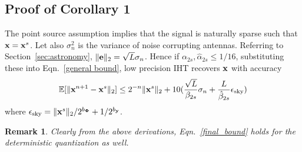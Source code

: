 \documentclass{article}
\newtheorem{remark}{Remark}
\begin{document}
\subsection{Proof of Corollary 1}
The point source assumption implies that the signal is naturally sparse such that ${\bf x} = {\bf x}^s$. Let also $\sigma_n^2$ is the variance of noise corrupting antennas. Referring to Section~\ref{sec:astronomy}, $\|{\bf e} \|_2 = \sqrt{L}\sigma_n$. Hence if $\alpha_{2s}, \hat{\alpha}_{2s}\leq 1/16$, substituting these into Eqn.~\ref{general bound}, low precision IHT recovers ${\bf x}$ with accuracy
\begin{equation}\label{final_bound}
    \mathbb{E}[\|{\bf x}^{n+1} - {\bf x}^s \|_2] \leq 2^{-n}\| {\bf x}^s\|_2 + 10(\frac{\sqrt{L}}{\beta_{2s}}\sigma_n+\frac{L}{\hat{\beta}_{2s}}\epsilon_{\rm{sky}})
\end{equation}
where $\epsilon_{\rm{sky}} =  \|{\bf x}^s \|_2/2^{b_{\bf \Phi}} + 1/2^{b_{\bf y}}$.
\begin{remark}
Clearly from the above derivations, Eqn.~\ref{final_bound} holds for the deterministic quantization as well.
\end{remark}
\end{document}
